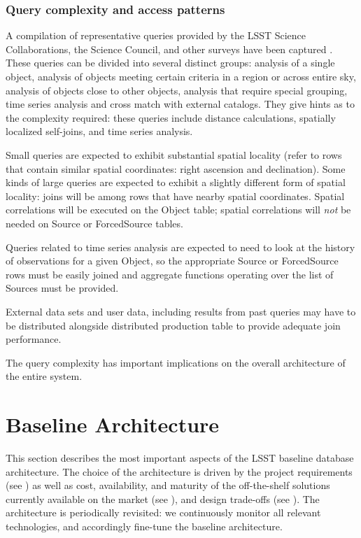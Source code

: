\documentclass[DM,lsstdraft,toc]{lsstdoc}
\begin{document}
\subsubsection{Query complexity and access
patterns}\label{query-complexity-and-access-patterns}

A compilation of representative queries provided by the LSST Science
Collaborations, the Science Council, and other surveys have been
captured \citep{CommonQueries}. These queries can be divided into
several distinct groups: analysis of a single object, analysis of
objects meeting certain criteria in a region or across entire sky,
analysis of objects close to other objects, analysis that require
special grouping, time series analysis and cross match with external
catalogs. They give hints as to the complexity required: these queries
include distance calculations, spatially localized self-joins, and time
series analysis.

Small queries are expected to exhibit substantial spatial locality
(refer to rows that contain similar spatial coordinates: right ascension
and declination). Some kinds of large queries are expected to exhibit a
slightly different form of spatial locality: joins will be among rows
that have nearby spatial coordinates. Spatial correlations will be
executed on the Object table; spatial correlations will \emph{not} be
needed on Source or ForcedSource tables.

Queries related to time series analysis are expected to need to look at
the history of observations for a given Object, so the appropriate
Source or ForcedSource rows must be easily joined and aggregate
functions operating over the list of Sources must be provided.

External data sets and user data, including results from past queries
may have to be distributed alongside distributed production table to
provide adequate join performance.

The query complexity has important implications on the overall
architecture of the entire system.

\section{Baseline Architecture}\label{baseline-architecture}

This section describes the most important aspects of the LSST baseline
database architecture. The choice of the architecture is driven by the project
requirements (see ) as well as cost, availability, and
maturity of the off-the-shelf solutions currently available on the market (see
), and design trade-offs (see ). The
architecture is periodically revisited: we continuously monitor all relevant
technologies, and accordingly fine-tune the baseline architecture.
\end{document}
